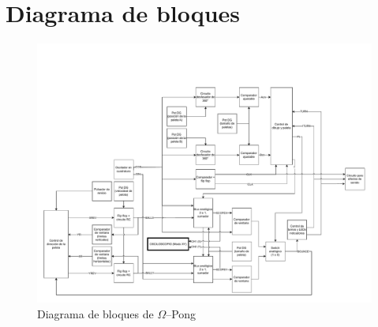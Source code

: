 \section{Diagrama de bloques}

\begin{figure}[H]
    \centering
    \includegraphics[width=\linewidth]{figs/db/PongO.pdf}
    \caption{Diagrama de bloques de $\Omega$--Pong}
    \label{ohmpong}
\end{figure}